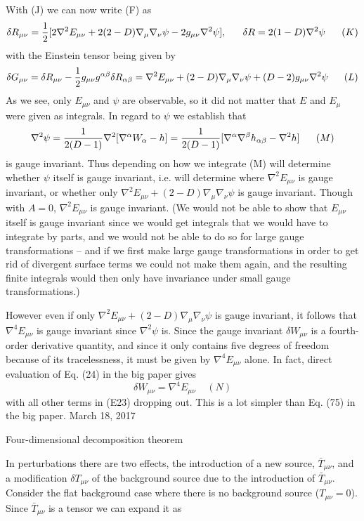 \documentclass[10pt,letterpaper]{article}
\numberwithin{equation}{section}
\begin{document}
With (J)  we can now write (F) as 
%
$$\delta R_{\mu\nu}={1 \over 2}[2\nabla^2E_{\mu\nu}+2(2-D)\nabla_{\mu}\nabla_{\nu}\psi-2g_{\mu\nu}\nabla^2\psi],~~~~~\delta R=2(1-D)\nabla^2\psi~~~~~(K)$$
%
with the Einstein tensor being given by 
%
$$\delta G_{\mu\nu}=\delta R_{\mu\nu}-{1 \over 2}g_{\mu\nu}g^{\alpha\beta}\delta R_{\alpha\beta}=\nabla^2E_{\mu\nu}+(2-D)\nabla_{\mu}\nabla_{\nu}\psi+(D-2)g_{\mu\nu}\nabla^2\psi~~~~~(L)$$
%
As we see, only $E_{\mu\nu}$ and $\psi$ are observable, so it did not matter that $E$ and $E_{\mu}$ were given as integrals. In regard to $\psi$ we establish that
%
$$\nabla^2\psi={1 \over 2(D-1)}\nabla^2[\nabla^{\alpha}W_{\alpha}-h]={1 \over 2(D-1)}[\nabla^{\alpha}\nabla^{\beta}h_{\alpha\beta}-\nabla^2h]~~~~~(M)$$
%
is gauge invariant. Thus depending on how we integrate (M) will determine whether $\psi$ itself is gauge invariant, i.e. will determine where $\nabla^2E_{\mu\nu}$ is gauge invariant, or whether only $\nabla^2E_{\mu\nu}+(2-D)\nabla_{\mu}\nabla_{\nu}\psi$ is gauge invariant. Though with $A=0$, $\nabla^2E_{\mu\nu}$ is gauge invariant. (We would not be able to show that $E_{\mu\nu}$ itself is gauge invariant since we would get integrals that we would have to integrate by parts, and we would not be able to do so for large gauge transformations -- and if we first make large gauge transformations in order to get rid of divergent surface terms we could not make them again, and the resulting finite integrals would then only have invariance under small gauge transformations.)

However even if only $\nabla^2E_{\mu\nu}+(2-D)\nabla_{\mu}\nabla_{\nu}\psi$ is gauge invariant, it follows that $\nabla^4E_{\mu\nu}$ is gauge invariant since $\nabla^2\psi$ is. Since the gauge invariant $\delta W_{\mu\nu}$ is a fourth-order derivative quantity, and since it only contains five degrees of freedom because of its tracelessness, it must be given by $\nabla^4E_{\mu\nu}$ alone. In fact, direct evaluation of Eq. (24) in the big paper gives 
%
$$\delta W_{\mu\nu}=\nabla^4E_{\mu\nu}~~~~~(N)$$
% 
with all other terms in (E23) dropping out. This is a lot simpler than Eq. (75) in the big paper.
\newpage
March 18, 2017


Four-dimensional decomposition theorem


In perturbations there are two effects, the introduction of a new source, $\bar{T}_{\mu\nu}$, and a modification $\delta T_{\mu\nu}$ of the background source due to the introduction of $\bar{T}_{\mu\nu}$. Consider the flat background case where there is no background source ($T_{\mu\nu}=0$).  Since $\bar{T}_{\mu\nu}$ is a tensor we can expand it as
\end{document}
